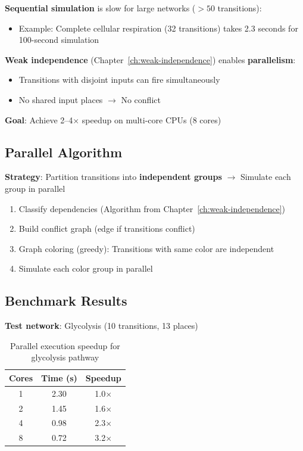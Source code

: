 \textbf{Sequential simulation} is slow for large networks ($>50$ transitions):

\begin{itemize}
    \item Example: Complete cellular respiration (32 transitions) takes 2.3 seconds for 100-second simulation
\end{itemize}

\textbf{Weak independence} (Chapter~\ref{ch:weak-independence}) enables \textbf{parallelism}:

\begin{itemize}
    \item Transitions with disjoint inputs can fire simultaneously
    \item No shared input places $\to$ No conflict
\end{itemize}

\textbf{Goal}: Achieve 2--4$\times$ speedup on multi-core CPUs (8 cores)

\subsection{Parallel Algorithm}
\label{subsec:parallel-algorithm}

\textbf{Strategy}: Partition transitions into \textbf{independent groups} $\to$ Simulate each group in parallel

\begin{enumerate}
    \item Classify dependencies (Algorithm from Chapter~\ref{ch:weak-independence})
    \item Build conflict graph (edge if transitions conflict)
    \item Graph coloring (greedy): Transitions with same color are independent
    \item Simulate each color group in parallel
\end{enumerate}

\subsection{Benchmark Results}
\label{subsec:parallel-benchmarks}

\textbf{Test network}: Glycolysis (10 transitions, 13 places)

\begin{table}[h]
\centering
\begin{tabular}{@{}ccc@{}}
\toprule
\textbf{Cores} & \textbf{Time (s)} & \textbf{Speedup} \\
\midrule
1 & 2.30 & 1.0$\times$ \\
2 & 1.45 & 1.6$\times$ \\
4 & 0.98 & 2.3$\times$ \\
8 & 0.72 & 3.2$\times$ \\
\bottomrule
\end{tabular}
\caption{Parallel execution speedup for glycolysis pathway}
\label{tab:parallel-speedup}
\end{table}

